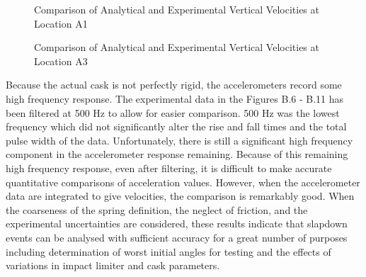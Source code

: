 \begin{figure}
\vspace{3.5 in}
\caption{Comparison of Analytical and Experimental Vertical 
Velocities at Location A1}
\end{figure}

\begin{figure}
\vspace{3.5 in}
\caption{Comparison of Analytical and Experimental Vertical 
Velocities at Location A3}
\end{figure}

Because the actual
cask is not perfectly rigid, the accelerometers record some high
frequency response.  The experimental data in the Figures B.6 - 
B.11 has been filtered at 500 Hz to allow for easier comparison.  500
Hz was the lowest frequency which did not significantly alter the
rise and fall times and the total pulse width of the data.
Unfortunately, there
is still a significant high frequency component in the accelerometer
response remaining. 
Because of this remaining high frequency response, even after
filtering, it is difficult to make accurate quantitative comparisons
of acceleration values. However, when the accelerometer data are
integrated to give velocities, the comparison is remarkably good. 
When the coarseness of the spring definition, the neglect of friction,
and the experimental uncertainties are considered, these results
indicate that slapdown events can be analysed with sufficient accuracy
for a great number of purposes including determination of worst
initial angles for testing and the effects of variations in impact
limiter and cask parameters. 
